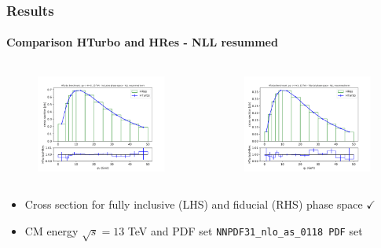 \documentclass[aspectratio=43]{beamer}
\begin{document}
\begin{frame}
	
	\frametitle{Results}
	\framesubtitle{Comparison HTurbo and HRes - NLL resummed}
	
	\footnotesize
	
	\begin{columns}
		
		
		\begin{figure}
			\includegraphics[width = 7cm]{plots/part3/chapter6/nlo-res-1.png}
		\end{figure}
		
		
		\begin{figure}
			\includegraphics[width = 7cm]{plots/part3/chapter6/nlo-res-fid-1.png}
		\end{figure}
		
	\end{columns}
	
	\begin{itemize}
		\item Cross section for fully inclusive (LHS) and fiducial (RHS) phase space {\color{darkgreen}$\checkmark$} 
		\item CM energy $\sqrt s = 13$ TeV and PDF set \texttt{NNPDF31\_nlo\_as\_0118 PDF} set
	\end{itemize}

\end{frame}
\end{document}
